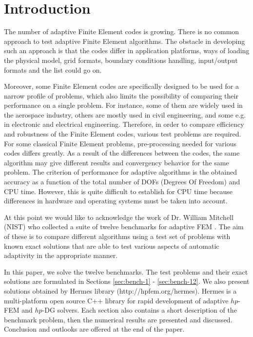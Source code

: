 \documentclass[12pt]{elsarticle}
\begin{document}
\section{Introduction}
\label{sec:intro}

The number of adaptive Finite Element codes is growing.
There is no common approach to test adaptive
Finite Element algorithms. The obstacle in developing such an approach is that
the codes differ in application platforms, ways of loading the physical model,
grid formats, boundary conditions handling, input/output formats and the list could go on.

Moreover, some Finite Element codes are specifically designed to be used for
a narrow profile of problems, which also limits the possibility of comparing
their performance on a single problem.
For instance, some of them are widely used in the aerospace industry, others are
mostly used in civil engineering, and some e.g. in electronic and electrical engineering.
Therefore, in order to compare efficiency and robustness of the Finite Element
codes, various test problems are required.
For some classical Finite Element problems, pre-processing
needed for various codes differs greatly.
As a result of the differences between the codes,
the same algorithm may give different results and convergency
behavior for the same problem.
The criterion of performance for adaptive algorithms
is the obtained accuracy as a function of the total number
of DOFs (Degrees Of Freedom) and CPU time. However,
this is quite difficult to establish for CPU time because
differences in hardware and operating systems must be taken into account.

At this point we would like to acknowledge the work of
Dr. William Mitchell (NIST) who collected a suite of
twelve benchmarks for adaptive FEM \cite{mitchell-1}.
The aim of these is to compare different algorithms
using a test set of problems with known exact solutions
that are able to test various aspects of automatic
adaptivity in the appropriate manner.

In this paper, we solve the twelve benchmarks.
The test problems and their exact solutions are
formulated in Sections \ref{sec:bench-1} - \ref{sec:bench-12}.
We also present solutions obtained by {\sc Hermes} library (http://hpfem.org/hermes).
{\sc Hermes} is a multi-platform open source C++
library for rapid development of adaptive $hp$-FEM
and $hp$-DG solvers. Each section also contains a short
description of the benchmark problem, then the numerical
results are presented and discussed. Conclusion and outlooks
are offered at the end of the paper.
\end{document}
